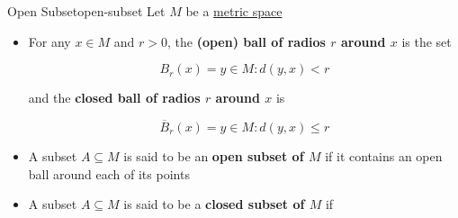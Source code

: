\begin{Definition}{Open Subset}{open-subset}
    Let $M$ be a \hyperref[def:metrix-space]{metric space}

    \begin{itemize}
        \item For any $x \in M$ and $r > 0$, the \textbf{(open) ball of radios $r$ around $x$} is the set

              \begin{equation}
                  B_r(x) = {y \in M : d(y, x) < r}
              \end{equation}

              and the \textbf{closed ball of radios $r$ around $x$} is

              \begin{equation}
                  \overline{B}_r(x) = {y \in M : d(y, x) \le r}
              \end{equation}

        \item A subset $A \subseteq M$ is said to be an \textbf{open subset of $M$} if it contains an open ball around
              each of its points
        \item A subset $A \subseteq M$ is said to be a \textbf{closed subset of $M$} if
    \end{itemize}
\end{Definition}
